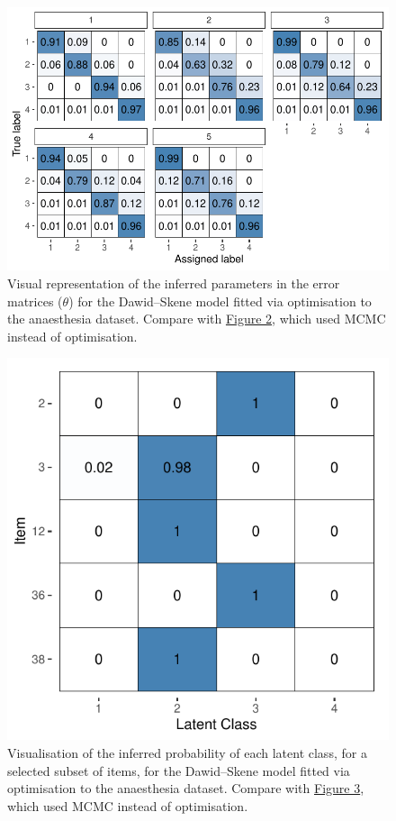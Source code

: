 \begin{figure}

{\centering \includegraphics{RJ-2023-064_files/figure-latex/plot-theta-fit2-1} 

}

\caption{Visual representation of the inferred parameters in the error matrices ($\theta$) for the Dawid--Skene model fitted via optimisation to the anaesthesia dataset.  Compare with \protect\hyperlink{fig:plot-theta}{Figure 2}, which used MCMC instead of optimisation.}\label{fig:plot-theta-fit2}
\end{figure}

\begin{figure}

{\centering \includegraphics{RJ-2023-064_files/figure-latex/plot-z-fit2-1} 

}

\caption{Visualisation of the inferred probability of each latent class, for a selected subset of items, for the Dawid--Skene model fitted via optimisation to the anaesthesia dataset.  Compare with \protect\hyperlink{fig:plot-z}{Figure 3}, which used MCMC instead of optimisation.}\label{fig:plot-z-fit2}
\end{figure}

